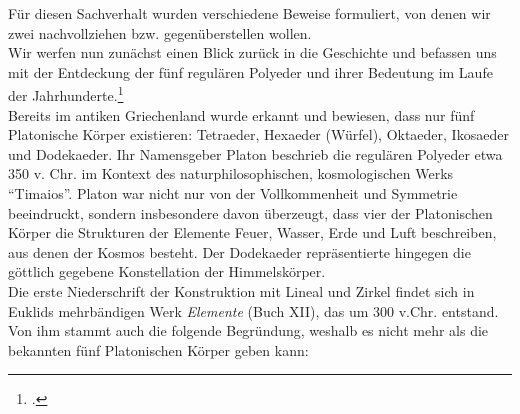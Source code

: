 Für diesen Sachverhalt wurden verschiedene Beweise formuliert, von denen wir zwei nachvollziehen bzw. gegenüberstellen wollen. \\
Wir werfen nun zunächst einen Blick zurück in die Geschichte und befassen uns mit der Entdeckung der fünf regulären Polyeder und ihrer Bedeutung im Laufe der Jahrhunderte.\footcite[Die Informationen zur Geschichte stammen von][]{Endl1993} \\
Bereits im antiken Griechenland wurde erkannt und bewiesen, dass nur fünf Platonische Körper existieren: Tetraeder, Hexaeder (Würfel), Oktaeder, Ikosaeder und Dodekaeder. Ihr Namensgeber Platon beschrieb die regulären Polyeder etwa 350 v. Chr. im Kontext des naturphilosophischen, kosmologischen Werks \enquote{Timaios}. Platon war nicht nur von der Vollkommenheit und Symmetrie beeindruckt, sondern insbesondere davon überzeugt, dass vier der Platonischen Körper die Strukturen der Elemente Feuer, Wasser, Erde und Luft beschreiben, aus denen der Kosmos besteht. Der Dodekaeder repräsentierte hingegen die göttlich gegebene Konstellation der Himmelskörper.\\
Die erste Niederschrift der Konstruktion mit Lineal und Zirkel findet sich in Euklids mehrbändigen Werk \textit{Elemente} (Buch XII), das um 300 v.Chr. entstand. Von ihm stammt auch die folgende Begründung, weshalb es nicht mehr als die bekannten fünf Platonischen Körper geben kann:
